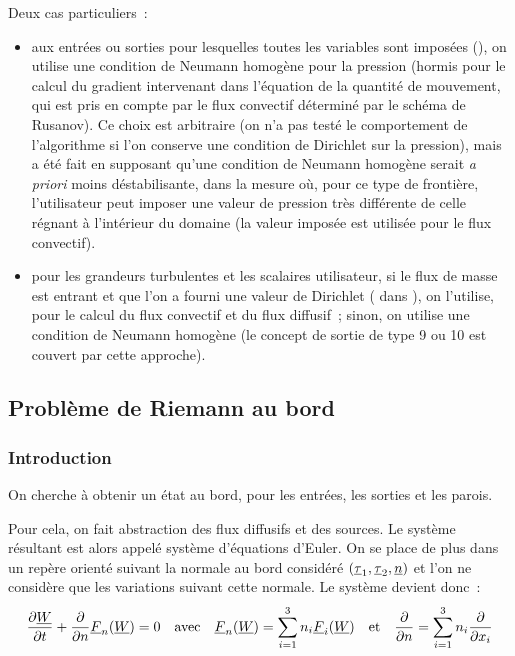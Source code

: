 Deux cas particuliers~:
\begin{itemize}
\item aux entrées ou sorties pour lesquelles toutes les variables sont imposées
(), on utilise une condition de Neumann homogène pour la pression
(hormis pour le calcul du gradient intervenant dans l'équation de la quantité
de mouvement, qui est pris en compte par le flux convectif déterminé par le
schéma de Rusanov). Ce choix est arbitraire (on n'a pas testé le comportement
de l'algorithme si l'on conserve une condition de Dirichlet sur la pression), mais
a été fait en supposant qu'une condition de Neumann homogène serait {\it a
priori} moins déstabilisante, dans la mesure où, pour ce type de frontière,
l'utilisateur peut imposer une valeur de pression très différente de
celle régnant à l'intérieur du domaine (la valeur imposée est utilisée
pour le flux convectif).
\item pour les grandeurs turbulentes et les scalaires utilisateur, si
le flux de masse est entrant et que l'on a fourni
une valeur de Dirichlet ( dans ),
on l'utilise, pour le calcul du flux convectif et du flux diffusif~;
sinon, on utilise une condition de Neumann homogène (le concept
de sortie de type 9 ou 10 est couvert par cette approche).
\end{itemize}



\subsection*{Problème de Riemann au bord}
\label{Cfbl_Cfxtcl_section_pb_riemann_cfener}

\subsubsection*{Introduction}

On cherche à obtenir un état au bord,
pour les entrées, les sorties et les parois.

Pour cela, on fait abstraction des flux diffusifs et des sources.
Le système résultant est alors appelé système
d'équations d'Euler. On se place de plus dans un
repère orienté suivant la normale au bord considéré
$(\underline{\tau}_1,\underline{\tau}_2,\underline{n})$
et l'on ne considère que les variations suivant cette normale.
Le système devient donc~:
\begin{equation}\label{Cfbl_Cfxtcl_eq_euler_cfxtcl}
\begin{array}{lllll}
\displaystyle\frac{\partial \underline{W}}{\partial t}
+ \frac{\partial}{\partial n}\underline{F}_n(\underline{W})
= 0
&\text{avec}
& \underline{F}_n(\underline{W})
 = \displaystyle\sum\limits_{i=1}^3 n_i \underline{F}_i(\underline{W})
& \text{et}
& \displaystyle\frac{\partial}{\partial n}
= \displaystyle\sum\limits_{i=1}^3 n_i \frac{\partial}{\partial x_i}
\end{array}
\end{equation}

